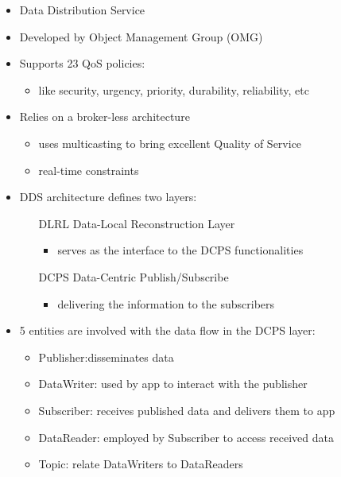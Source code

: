 \begin{itemize}
	\item Data Distribution Service
	\item Developed by Object Management Group (OMG)
	\item Supports 23 QoS policies:
	\begin{itemize}
		\item like security, urgency, priority, durability, reliability, etc
	\end{itemize}
	\item Relies on a broker-less architecture
	\begin{itemize}
		\item uses multicasting to bring excellent Quality of Service
		\item real-time constraints
	\end{itemize}
	\item DDS architecture defines two layers:
	\begin{itemize}
		\item[DLRL] Data-Local Reconstruction Layer
		\begin{itemize}
			\item serves as the interface to the DCPS functionalities
		\end{itemize}
		\item[DCPS] Data-Centric Publish/Subscribe
		\begin{itemize}
			\item delivering the information to the subscribers
		\end{itemize}
	\end{itemize}
	\item 5 entities are involved with the data flow in the DCPS layer:
	\begin{itemize}
		\item Publisher:disseminates data
		\item DataWriter: used by app to interact with the publisher
		\item Subscriber: receives published data and delivers them to app
		\item DataReader: employed by Subscriber to access received data
		\item Topic: relate DataWriters to DataReaders
	\end{itemize}
\end{itemize}

